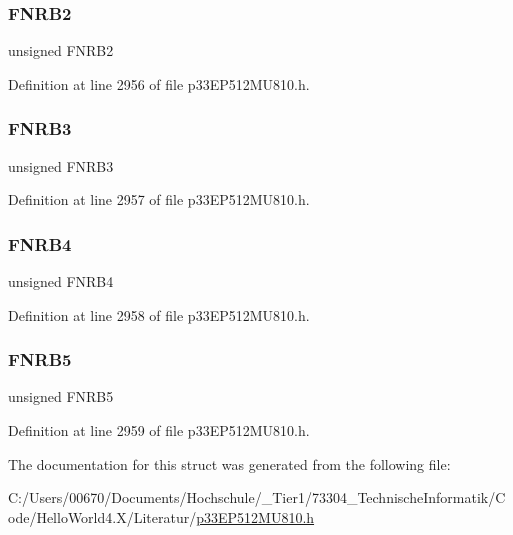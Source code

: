 \subsubsection{\texorpdfstring{F\+N\+R\+B2}{FNRB2}}
{\footnotesize\ttfamily unsigned F\+N\+R\+B2}



Definition at line 2956 of file p33\+E\+P512\+M\+U810.\+h.

\mbox{\label{structtag_c1_f_i_f_o_b_i_t_s_ab20b55838f7bd8b39c2c9b04de83ef34}} 
\subsubsection{\texorpdfstring{F\+N\+R\+B3}{FNRB3}}
{\footnotesize\ttfamily unsigned F\+N\+R\+B3}



Definition at line 2957 of file p33\+E\+P512\+M\+U810.\+h.

\mbox{\label{structtag_c1_f_i_f_o_b_i_t_s_a9095fcba1d93ad672ea64cf1cb2c0e71}} 
\subsubsection{\texorpdfstring{F\+N\+R\+B4}{FNRB4}}
{\footnotesize\ttfamily unsigned F\+N\+R\+B4}



Definition at line 2958 of file p33\+E\+P512\+M\+U810.\+h.

\mbox{\label{structtag_c1_f_i_f_o_b_i_t_s_a5397efb64ea26a685f138eeda891a3b6}} 
\subsubsection{\texorpdfstring{F\+N\+R\+B5}{FNRB5}}
{\footnotesize\ttfamily unsigned F\+N\+R\+B5}



Definition at line 2959 of file p33\+E\+P512\+M\+U810.\+h.



The documentation for this struct was generated from the following file\+:\begin{DoxyCompactItemize}
\item 
C\+:/\+Users/00670/\+Documents/\+Hochschule/\+\_\+\+Tier1/73304\+\_\+\+Technische\+Informatik/\+Code/\+Hello\+World4.\+X/\+Literatur/\hyperlink{p33_e_p512_m_u810_8h}{p33\+E\+P512\+M\+U810.\+h}\end{DoxyCompactItemize}

